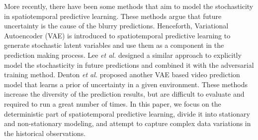 \documentclass[10pt,twocolumn,letterpaper]{article}
\begin{document}
More recently, there have been some methods that aim to model the stochasticity in spatiotemporal predictive learning. %
These methods argue that future uncertainty is the cause of the blurry predictions. Henceforth, Variational Autoencoder (VAE) \citep{kingma2013auto} is introduced to spatiotemporal predictive learning to generate stochastic latent variables and use them as a component in the prediction making process. Lee \textit{et al.} \citep{lee2018stochastic} designed a similar approach to explicitly model the stochasticity in future predictions and combined it with the adversarial training method. Denton \textit{et al.} \citep{denton2018stochastic} proposed another VAE based video prediction model that learns a prior of uncertainty in a given environment. These methods increase the diversity of the prediction results, but are difficult to evaluate and required to run a great number of times. In this paper, we focus on the deterministic part of spatiotemporal predictive learning, divide it into stationary and non-stationary modeling, and attempt to capture complex data variations in the historical observations.



\end{document}
